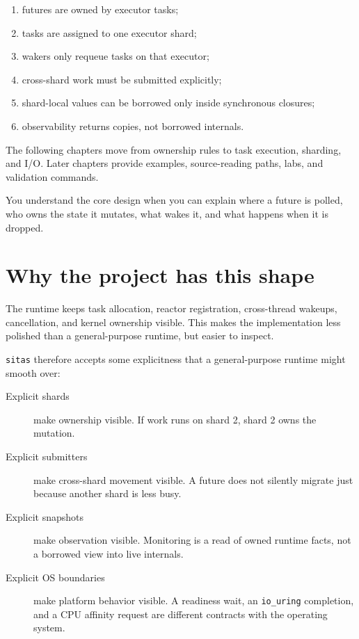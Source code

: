 \begin{enumerate}
    \item futures are owned by executor tasks;
    \item tasks are assigned to one executor shard;
    \item wakers only requeue tasks on that executor;
    \item cross-shard work must be submitted explicitly;
    \item shard-local values can be borrowed only inside synchronous closures;
    \item observability returns copies, not borrowed internals.
\end{enumerate}

The following chapters move from ownership rules to task execution, sharding,
and I/O. Later chapters provide examples, source-reading paths, labs, and
validation commands.

\begin{notabene}
You understand the core design when you can explain where a future is polled,
who owns the state it mutates, what wakes it, and what happens when it is
dropped.
\end{notabene}

\section{Why the project has this shape}

The runtime keeps task allocation, reactor registration, cross-thread wakeups,
cancellation, and kernel ownership visible. This makes the implementation less
polished than a general-purpose runtime, but easier to inspect.

\texttt{sitas} therefore accepts some explicitness that a general-purpose
runtime might smooth over:

\begin{description}
    \item[Explicit shards] make ownership visible. If work runs on shard 2,
        shard 2 owns the mutation.
    \item[Explicit submitters] make cross-shard movement visible. A future does
        not silently migrate just because another shard is less busy.
    \item[Explicit snapshots] make observation visible. Monitoring is a read of
        owned runtime facts, not a borrowed view into live internals.
    \item[Explicit OS boundaries] make platform behavior visible. A readiness
        wait, an \texttt{io\_uring} completion, and a CPU affinity request are
        different contracts with the operating system.
\end{description}

